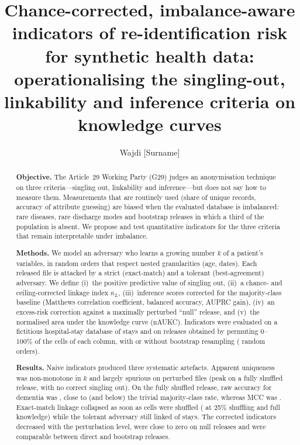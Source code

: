 \documentclass[preprint,12pt]{elsarticle}
\newcommand{\kL}{\kappa_{L}}
\newcommand{\G}{G29}
\begin{document}
\begin{frontmatter}

\title{Chance-corrected, imbalance-aware indicators of re-identification risk for synthetic health data: operationalising the singling-out, linkability and inference criteria on knowledge curves}

\author[lab]{Wajdi [Surname]}
\ead{[email]}

\begin{abstract}
\textbf{Objective.} The Article~29 Working Party (\G{}) judges an anonymisation technique on three criteria---singling out, linkability and inference---but does not say how to measure them. Measurements that are routinely used (share of unique records, accuracy of attribute guessing) are biased when the evaluated database is imbalanced: rare diseases, rare discharge modes and bootstrap releases in which a third of the population is absent. We propose and test quantitative indicators for the three criteria that remain interpretable under imbalance.

\textbf{Methods.} We model an adversary who learns a growing number $k$ of a patient's variables, in random orders that respect nested granularities (age, dates). Each released file is attacked by a strict (exact-match) and a tolerant (best-agreement) adversary. We define (i)~the positive predictive value of singling out, (ii)~a chance- and ceiling-corrected linkage index $\kL$, (iii)~inference scores corrected for the majority-class baseline (Matthews correlation coefficient, balanced accuracy, AUPRC gain), (iv)~an excess-risk correction against a maximally perturbed ``null'' release, and (v)~the normalised area under the knowledge curve (nAUKC). Indicators were evaluated on a fictitious hospital-stay database of \Nrec{} stays and on releases obtained by permuting 0--100\% of the cells of each column, with or without bootstrap resampling (\Norders{} random orders).

\textbf{Results.} Naive indicators produced three systematic artefacts. Apparent uniqueness was non-monotone in $k$ and largely spurious on perturbed files (peak \UniqPeakDirHundred{} on a fully shuffled release, with no correct singling out). On the fully shuffled release, raw accuracy for dementia was \InfDemAccDirHundred{}, close to (and below) the trivial majority-class rate, whereas MCC was \InfDemMccDirHundred{}. Exact-match linkage collapsed as soon as cells were shuffled (\LinkExDirTwentyFive{} at 25\% shuffling and full knowledge) while the tolerant adversary still linked \LinkNNDirTwentyFive{} of stays. The corrected indicators decreased with the perturbation level, were close to zero on null releases and were comparable between direct and bootstrap releases.


\end{abstract}
\end{frontmatter}
\end{document}
